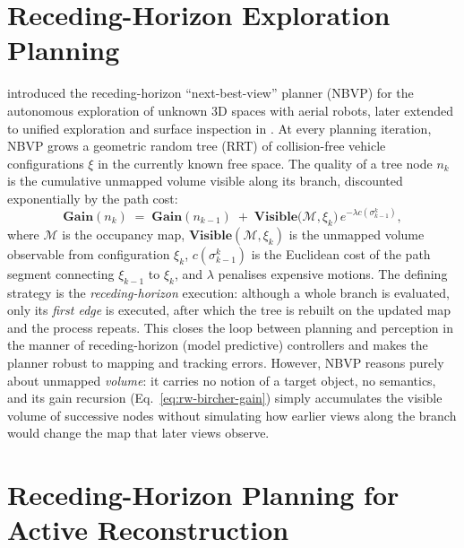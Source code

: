 \section{Receding-Horizon Exploration Planning}
\label{sec:rw-rh-exploration}

\textcite{bircher2016} introduced the receding-horizon
``next-best-view'' planner (NBVP) for the autonomous exploration of
unknown 3D spaces with aerial robots, later extended to unified
exploration and surface inspection in \textcite{bircher2018}. At every
planning iteration, NBVP grows a geometric random tree (RRT) of
collision-free vehicle configurations $\xi$ in the currently known free
space. The quality of a tree node $n_k$ is the cumulative unmapped
volume visible along its branch, discounted exponentially by the path
cost:
%
\begin{equation}
  \mathbf{Gain}(n_k) \;=\; \mathbf{Gain}(n_{k-1})
  \;+\; \mathbf{Visible}\bigl(\mathcal{M}, \xi_k\bigr)\,
        e^{-\lambda c\left(\sigma_{k-1}^{k}\right)},
  \label{eq:rw-bircher-gain}
\end{equation}
%
where $\mathcal{M}$ is the occupancy map,
$\mathbf{Visible}(\mathcal{M},\xi_k)$ is the unmapped volume observable
from configuration $\xi_k$, $c(\sigma_{k-1}^{k})$ is the Euclidean cost
of the path segment connecting $\xi_{k-1}$ to $\xi_k$, and $\lambda$
penalises expensive motions. The defining strategy is the
\emph{receding-horizon} execution: although a whole branch is evaluated,
only its \emph{first edge} is executed, after which the tree is rebuilt
on the updated map and the process repeats. This closes the loop between
planning and perception in the manner of receding-horizon (model
predictive) controllers and makes the planner robust to mapping and
tracking errors. However, NBVP reasons purely about unmapped
\emph{volume}: it carries no notion of a target object, no semantics,
and its gain recursion (Eq.~\ref{eq:rw-bircher-gain}) simply accumulates
the visible volume of successive nodes without simulating how earlier
views along the branch would change the map that later views observe.

\section{Receding-Horizon Planning for Active Reconstruction}
\label{sec:rw-rh-reconstruction}

